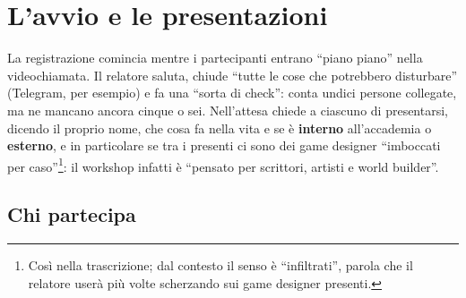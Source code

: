 \section{L'avvio e le presentazioni}
\label{sec:z6-avvio}

La registrazione comincia mentre i partecipanti entrano ``piano piano'' nella
videochiamata. Il relatore saluta, chiude ``tutte le cose che potrebbero
disturbare'' (Telegram, per esempio) e fa una ``sorta di check'': conta undici
persone collegate, ma ne mancano ancora cinque o sei. Nell'attesa chiede a
ciascuno di presentarsi, dicendo il proprio nome, che cosa fa nella vita e se
è \textbf{interno} all'accademia o \textbf{esterno}, e in particolare se tra i
presenti ci sono dei game designer ``imboccati per caso''\footnote{Così nella
trascrizione; dal contesto il senso è ``infiltrati'', parola che il relatore
userà più volte scherzando sui game designer presenti.}: il workshop infatti
è ``pensato per scrittori, artisti e world builder''.

\subsection{Chi partecipa}
\label{subsec:z6-partecipanti}


